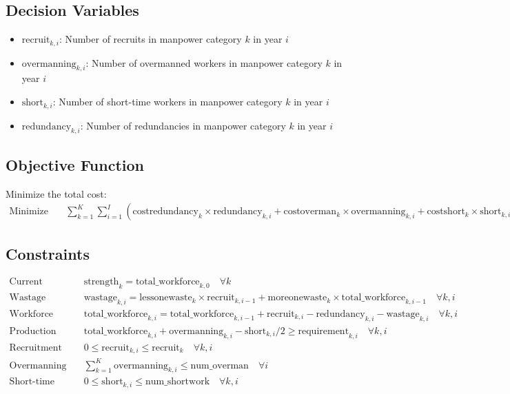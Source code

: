 \documentclass{article}
\begin{document}
\subsection*{Decision Variables}
\begin{itemize}
    \item \( \text{recruit}_{k, i} \): Number of recruits in manpower category \( k \) in year \( i \)
    \item \( \text{overmanning}_{k, i} \): Number of overmanned workers in manpower category \( k \) in year \( i \)
    \item \( \text{short}_{k, i} \): Number of short-time workers in manpower category \( k \) in year \( i \)
    \item \( \text{redundancy}_{k, i} \): Number of redundancies in manpower category \( k \) in year \( i \)
\end{itemize}

\subsection*{Objective Function}
Minimize the total cost:
\[
\begin{align*}
\text{Minimize} \quad & \sum_{k=1}^{K} \sum_{i=1}^{I} \left( \text{costredundancy}_{k} \times \text{redundancy}_{k, i} + \text{costoverman}_{k} \times \text{overmanning}_{k, i} + \text{costshort}_{k} \times \text{short}_{k, i} \right)
\end{align*}
\]

\subsection*{Constraints}

\begin{align*}
\text{Current Workforce:} \quad & \text{strength}_{k} = \text{total\_workforce}_{k, 0} \quad \forall k \\
\text{Wastage Calculation:} \quad & \text{wastage}_{k, i} = \text{lessonewaste}_{k} \times \text{recruit}_{k, i-1} + \text{moreonewaste}_{k} \times \text{total\_workforce}_{k, i-1} \quad \forall k, i \\
\text{Workforce Evolution:} \quad & \text{total\_workforce}_{k, i} = \text{total\_workforce}_{k, i-1} + \text{recruit}_{k, i} - \text{redundancy}_{k, i} - \text{wastage}_{k, i} \quad \forall k, i \\
\text{Production Requirement:} \quad & \text{total\_workforce}_{k, i} + \text{overmanning}_{k, i} - \text{short}_{k, i} / 2 \geq \text{requirement}_{k, i} \quad \forall k, i \\
\text{Recruitment Limit:} \quad & 0 \leq \text{recruit}_{k, i} \leq \text{recruit}_{k} \quad \forall k, i \\
\text{Overmanning Limit:} \quad & \sum_{k=1}^{K} \text{overmanning}_{k, i} \leq \text{num\_overman} \quad \forall i \\
\text{Short-time Working Limit:} \quad & 0 \leq \text{short}_{k, i} \leq \text{num\_shortwork} \quad \forall k, i \\
\end{align*}
\end{document}

